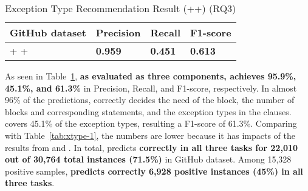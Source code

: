 \begin{table}[t]%
  \caption{Exception Type Recommendation Result (\xblock+\xstate+\xtype) (RQ3)}
  \vspace{-12pt}
  \small
	\begin{center}
		\renewcommand{\arraystretch}{1}
		\begin{tabular}{| p{3.10cm}<{\centering} | p{1.2cm}<{\centering} | p{1.2cm}<{\centering}| p{1.2cm}<{\centering}|}
		  \hline
			GitHub dataset  & Precision  & Recall & F1-score \\
			\hline
			\xblock + \xstate  + \xtype  & {\bf 0.959}  &  {\bf 0.451} & {\bf 0.613}\\
			\hline
		\end{tabular}
		\label{tab:xtype-4}
	\end{center}
\end{table}

As seen in Table~\ref{tab:xtype-4}, {\bf {\tool} as evaluated as three
  components, achieves 95.9\%, 45.1\%, and 61.3\%} in Precision,
Recall, and F1-score, respectively. In almost 96\% of the predictions,
{\tool} correctly decides the need of the  block, the
number of blocks and corresponding statements, and the exception types
in the  clauses. {\tool} covers 45.1\% of the exception
types, resulting a F1-score of 61.3\%. Comparing with
Table~\ref{tab:xtype-1}, the numbers are lower because it has impacts
of the results from \xblock and \xstate. In total, {\tool} predicts
{\bf correctly in all three tasks for 22,010 out of 30,764 total
  instances (71.5\%)} in GitHub dataset. Among 15,328 positive
samples, {\bf {\tool} predicts correctly 6,928 positive instances
  (45\%) in all three tasks}.

